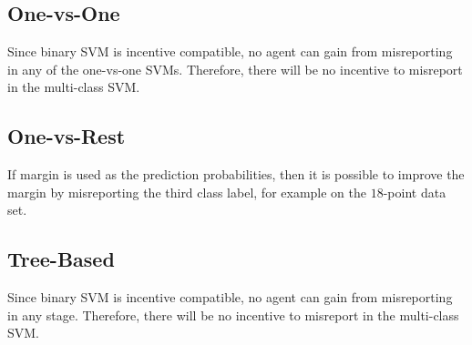 \documentclass{article}
\begin{document}
\subsection{One-vs-One}
Since binary SVM is incentive compatible, no agent can gain from misreporting in any of the one-vs-one SVMs. Therefore, there will be no incentive to misreport in the multi-class SVM.
\newline \newline


\subsection{One-vs-Rest}
If margin is used as the prediction probabilities, then it is possible to improve the margin by misreporting the third class label, for example on the $18$-point data set.
\newline \newline


\subsection{Tree-Based}
Since binary SVM is incentive compatible, no agent can gain from misreporting in any stage. Therefore, there will be no incentive to misreport in the multi-class SVM.
\newline \newline


\end{document}
